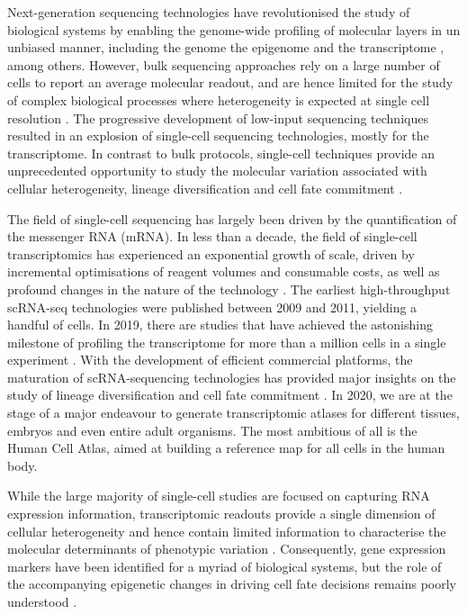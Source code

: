 Next-generation sequencing technologies have revolutionised the study of biological systems by enabling the genome-wide profiling of molecular layers in un unbiased manner, including the genome \cite{Fleischmann1995} the epigenome \cite{Frommer1992} and the transcriptome \cite{Lister2008,Bainbridge2006,Nagalakshmi2008,Mortazavi2008}, among others. However, bulk sequencing approaches rely on a large number of cells to report an average molecular readout, and are hence limited for the study of complex biological processes where heterogeneity is expected at single cell resolution \cite{Griffiths2018,Papalexi2017,Patel2014}. The progressive development of low-input sequencing techniques resulted in an explosion of single-cell sequencing technologies, mostly for the transcriptome. In contrast to bulk protocols, single-cell techniques provide an unprecedented opportunity to study the molecular variation associated with cellular heterogeneity, lineage diversification and cell fate commitment \cite{Kolodziejczyk2015}.

The field of single-cell sequencing has largely been driven by the quantification of the messenger RNA (mRNA). In less than a decade, the field of single-cell transcriptomics has experienced an exponential growth of scale, driven by incremental optimisations of reagent volumes and consumable costs, as well as profound changes in the nature of the technology \cite{Svensson2018}. The earliest high-throughput scRNA-seq technologies were published between 2009 and 2011, yielding a handful of cells. In 2019, there are studies that have achieved the astonishing milestone of profiling the transcriptome for more than a million cells in a single experiment \cite{Cao2019}. With the development of efficient commercial platforms, the maturation of scRNA-sequencing technologies has provided major insights on the study of lineage diversification and cell fate commitment \cite{Kolodziejczyk2015,Griffiths2018,Papalexi2017,Patel2014}. In 2020, we are at the stage of a major endeavour to generate transcriptomic atlases for different tissues, embryos and even entire adult organisms. The most ambitious of all is the Human Cell Atlas, aimed at building a reference map for all cells in the human body\cite{Aviv2017}.

While the large majority of single-cell studies are focused on capturing RNA expression information, transcriptomic readouts provide a single dimension of cellular heterogeneity and hence contain limited information to characterise the molecular determinants of phenotypic variation \cite{Ritchie2015}. Consequently, gene expression markers have been identified for a myriad of biological systems, but the role of the accompanying epigenetic changes in driving cell fate decisions remains poorly understood \cite{Griffiths2018,Kelsey2017,Bheda2014}.

